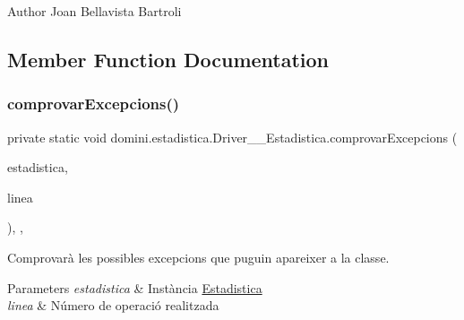 \begin{DoxyAuthor}{Author}
Joan Bellavista Bartroli 
\end{DoxyAuthor}


\subsection{Member Function Documentation}
\mbox{\label{classdomini_1_1estadistica_1_1Driver____Estadistica_a3459f11af9841b23ac81a409a3e84e22}} 
\subsubsection{\texorpdfstring{comprovar\+Excepcions()}{comprovarExcepcions()}}
{\footnotesize\ttfamily private static void domini.\+estadistica.\+Driver\+\_\+\+\_\+\+Estadistica.\+comprovar\+Excepcions (\begin{DoxyParamCaption}\item[{\hyperlink{classdomini_1_1estadistica_1_1Estadistica}{Estadistica}}]{estadistica,  }\item[{String}]{linea }\end{DoxyParamCaption})\hspace{0.3cm}{\ttfamily [inline]}, {\ttfamily [static]}, {\ttfamily [private]}}



Comprovarà les possibles excepcions que puguin apareixer a la classe. 


\begin{DoxyParams}{Parameters}
{\em estadistica} & Instància \hyperlink{classdomini_1_1estadistica_1_1Estadistica}{Estadistica} \\
\hline
{\em linea} & Número de operació realitzada \\
\hline
\end{DoxyParams}
\mbox{\label{classdomini_1_1estadistica_1_1Driver____Estadistica_a7f11e0ccad919e427af9c591cf910bfe}} 
